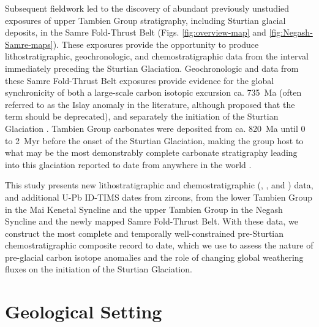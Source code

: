 Subsequent fieldwork led to the discovery of abundant previously unstudied exposures of upper Tambien Group stratigraphy, including Sturtian glacial deposits, in the Samre Fold-Thrust Belt (Figs. \ref{fig:overview-map} and \ref{fig:Negash-Samre-maps}). These exposures provide the opportunity to produce lithostratigraphic, geochronologic, and chemostratigraphic data from the interval immediately preceding the Sturtian Glaciation. Geochronologic and \dC data from these Samre Fold-Thrust Belt exposures provide evidence for the global synchronicity of both a large-scale carbon isotopic excursion ca. 735~Ma (often referred to as the Islay anomaly in the literature, although \citealp{Fairchild2018a} proposed that the term should be deprecated), and separately the initiation of the Sturtian Glaciation \citep{MacLennan2018a}. Tambien Group carbonates were deposited from ca. 820~Ma until 0 to 2~Myr before the onset of the Sturtian Glaciation, making the group host to what may be the most demonstrably complete carbonate stratigraphy leading into this glaciation reported to date from anywhere in the world \citep{MacLennan2018a}.

This study presents new lithostratigraphic and chemostratigraphic (\dC, \dO, and \SrSr) data, and additional U-Pb ID-TIMS dates from zircons, from the lower Tambien Group in the Mai Kenetal Syncline and the upper Tambien Group in the Negash Syncline and the newly mapped Samre Fold-Thrust Belt. With these data, we construct the most complete and temporally well-constrained pre-Sturtian chemostratigraphic composite record to date, which we use to assess the nature of pre-glacial carbon isotope anomalies and the role of changing global weathering fluxes on the initiation of the Sturtian Glaciation.

\section{Geological Setting}

